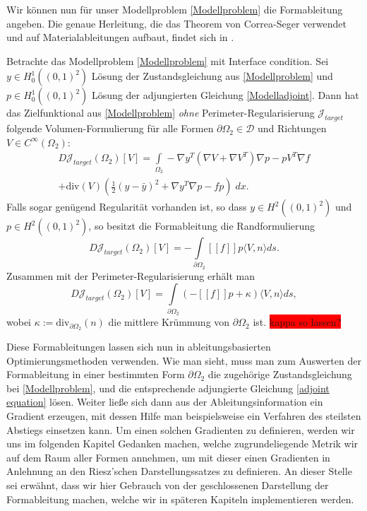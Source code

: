 Wir können nun für unser Modellproblem \ref{Modellproblem} die Formableitung angeben. Die genaue Herleitung, die das Theorem von Correa-Seger verwendet und auf  Materialableitungen aufbaut, findet sich in \cite{shape_space}.

\begin{theorem}
	Betrachte das Modellproblem \ref{Modellproblem} mit Interface condition. Sei $y\in H^1_0((0,1)^2)$ Lösung der Zustandsgleichung aus \ref{Modellproblem} und $p\in H^1_0((0,1)^2)$ Lösung der adjungierten Gleichung \ref{Modelladjoint}. Dann hat das Zielfunktional aus \ref{Modellproblem} \textit{ohne} Perimeter-Regularisierung $\mathcal{J}_{target}$ folgende Volumen-Formulierung für alle Formen $\partial\Omega_2 \in \mathcal{D}$ und Richtungen $V \in C^\infty(\Omega_2)$:
	\begin{equation}
	\begin{aligned}
		D\mathcal{J}_{target}(\Omega_2)[V] = \underset{\Omega_2}{\int} -\nabla y^T (\nabla V + \nabla V^T) \nabla p - p V^T \nabla f \\ + \text{div} (V) (\frac{1}{2}(y-\bar{y})^2 + \nabla y^T \nabla p - fp)\; dx.
	\end{aligned}
	\end{equation}
	Falls sogar genügend Regularität vorhanden ist, so dass $y \in H^2((0,1)^2)$ und $p \in H^2((0,1)^2)$, so besitzt die Formableitung die Randformulierung
	\begin{equation}
	D\mathcal{J}_{target}(\Omega_2)[V] = -\underset{\partial\Omega_2}{\int} [[f]]p \langle V,n \rangle ds.
	\end{equation}
	Zusammen mit der Perimeter-Regularisierung erhält man
	\begin{equation}
	D\mathcal{J}_{target}(\Omega_2)[V] = \underset{\partial\Omega_2}{\int} (-[[f]]p  + \kappa )\langle V,n \rangle ds,
	\end{equation}
	wobei $\kappa := \text{div}_{\partial\Omega_2}(n)$ die mittlere Krümmung von $\partial\Omega_2$ ist. \colorbox{red}{kappa so lassen?}
\end{theorem}

Diese Formableitungen lassen sich nun in ableitungsbasierten Optimierungsmethoden verwenden. Wie man sieht, muss man zum Auswerten der Formableitung in einer bestimmten Form $\partial\Omega_2$ die zugehörige Zustandsgleichung bei \ref{Modellproblem}, und die entsprechende adjungierte Gleichung \ref{adjoint equation} lösen. Weiter ließe sich dann aus der Ableitungsinformation ein Gradient erzeugen, mit dessen Hilfe man beispielsweise ein Verfahren des steilsten Abstiegs einsetzen kann. Um einen solchen Gradienten zu definieren, werden wir uns im folgenden Kapitel Gedanken machen, welche zugrundeliegende Metrik wir auf dem Raum aller Formen annehmen, um mit dieser einen Gradienten in Anlehnung an den Riesz'schen Darstellungssatzes zu definieren. An dieser Stelle sei erwähnt, dass wir hier Gebrauch von der geschlossenen Darstellung der Formableitung machen, welche wir in späteren Kapiteln implementieren werden. 

